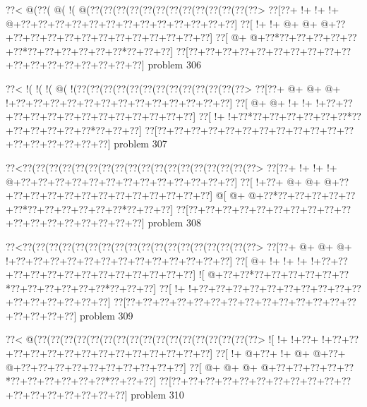 \vbox{\vbox{\goo
\0??<\- @(\0??(\- @(\- !(\- @(\0??(\0??(\0??(\0??(\0??(\0??(\0??(\0??(\0??(\0??(\0??(\0??(\0??>
\0??[\0??+\- !+\- !+\- !+\- @+\0??+\0??+\0??+\0??+\0??+\0??+\0??+\0??+\0??+\0??+\0??+\0??+\0??]
\0??[\- !+\- !+\- @+\- @+\- @+\0??+\0??+\0??+\0??+\0??+\0??+\0??+\0??+\0??+\0??+\0??+\0??+\0??]
\0??[\- @+\- @+\0??*\0??+\0??+\0??+\0??+\0??+\0??*\0??+\0??+\0??+\0??+\0??+\0??*\0??+\0??+\0??]
\0??[\0??+\0??+\0??+\0??+\0??+\0??+\0??+\0??+\0??+\0??+\0??+\0??+\0??+\0??+\0??+\0??+\0??+\0??]
}
\hfil problem 306\hfil\break
}



\vbox{\vbox{\goo
\0??<\- !(\- !(\- !(\- @(\- !(\0??(\0??(\0??(\0??(\0??(\0??(\0??(\0??(\0??(\0??(\0??(\0??(\0??>
\0??[\0??+\- @+\- @+\- @+\- !+\0??+\0??+\0??+\0??+\0??+\0??+\0??+\0??+\0??+\0??+\0??+\0??+\0??]
\0??[\- @+\- @+\- !+\- !+\- !+\0??+\0??+\0??+\0??+\0??+\0??+\0??+\0??+\0??+\0??+\0??+\0??+\0??]
\0??[\- !+\- !+\0??*\0??+\0??+\0??+\0??+\0??+\0??*\0??+\0??+\0??+\0??+\0??+\0??*\0??+\0??+\0??]
\0??[\0??+\0??+\0??+\0??+\0??+\0??+\0??+\0??+\0??+\0??+\0??+\0??+\0??+\0??+\0??+\0??+\0??+\0??]
}
\hfil problem 307\hfil\break
}



\vbox{\vbox{\goo
\0??<\0??(\0??(\0??(\0??(\0??(\0??(\0??(\0??(\0??(\0??(\0??(\0??(\0??(\0??(\0??(\0??(\0??(\0??>
\0??[\0??+\- !+\- !+\- !+\- @+\0??+\0??+\0??+\0??+\0??+\0??+\0??+\0??+\0??+\0??+\0??+\0??+\0??]
\0??[\- !+\0??+\- @+\- @+\- @+\0??+\0??+\0??+\0??+\0??+\0??+\0??+\0??+\0??+\0??+\0??+\0??+\0??]
\- @[\- @+\- @+\0??*\0??+\0??+\0??+\0??+\0??+\0??*\0??+\0??+\0??+\0??+\0??+\0??*\0??+\0??+\0??]
\0??[\0??+\0??+\0??+\0??+\0??+\0??+\0??+\0??+\0??+\0??+\0??+\0??+\0??+\0??+\0??+\0??+\0??+\0??]
}
\hfil problem 308\hfil\break
}



\vbox{\vbox{\goo
\0??<\0??(\0??(\0??(\0??(\0??(\0??(\0??(\0??(\0??(\0??(\0??(\0??(\0??(\0??(\0??(\0??(\0??(\0??>
\0??[\0??+\- @+\- @+\- @+\- !+\0??+\0??+\0??+\0??+\0??+\0??+\0??+\0??+\0??+\0??+\0??+\0??+\0??]
\0??[\- @+\- !+\- !+\- !+\- !+\0??+\0??+\0??+\0??+\0??+\0??+\0??+\0??+\0??+\0??+\0??+\0??+\0??]
\- ![\- @+\0??+\0??*\0??+\0??+\0??+\0??+\0??+\0??*\0??+\0??+\0??+\0??+\0??+\0??*\0??+\0??+\0??]
\0??[\- !+\- !+\0??+\0??+\0??+\0??+\0??+\0??+\0??+\0??+\0??+\0??+\0??+\0??+\0??+\0??+\0??+\0??]
\0??[\0??+\0??+\0??+\0??+\0??+\0??+\0??+\0??+\0??+\0??+\0??+\0??+\0??+\0??+\0??+\0??+\0??+\0??]
}
\hfil problem 309\hfil\break
}



\vbox{\vbox{\goo
\0??<\- @(\0??(\0??(\0??(\0??(\0??(\0??(\0??(\0??(\0??(\0??(\0??(\0??(\0??(\0??(\0??(\0??(\0??>
\- ![\- !+\- !+\0??+\- !+\0??+\0??+\0??+\0??+\0??+\0??+\0??+\0??+\0??+\0??+\0??+\0??+\0??+\0??]
\0??[\- !+\- @+\0??+\- !+\- @+\- @+\0??+\- @+\0??+\0??+\0??+\0??+\0??+\0??+\0??+\0??+\0??+\0??]
\0??[\- @+\- @+\- @+\- @+\0??+\0??+\0??+\0??+\0??*\0??+\0??+\0??+\0??+\0??+\0??*\0??+\0??+\0??]
\0??[\0??+\0??+\0??+\0??+\0??+\0??+\0??+\0??+\0??+\0??+\0??+\0??+\0??+\0??+\0??+\0??+\0??+\0??]
}
\hfil problem 310\hfil\break
}



